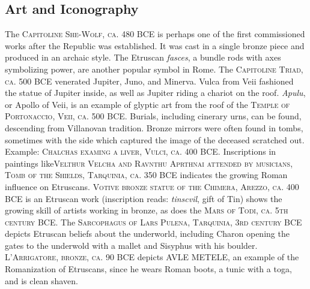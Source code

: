 \documentclass{article}
\begin{document}
\subsection{Art and Iconography}
The \textsc{Capitoline She-Wolf, ca. 480 BCE} is perhaps one of the first commissioned works after the Republic was established.  It was cast in a single bronze piece and produced in an archaic style.  The Etruscan \textit{fasces}, a bundle rods with axes symbolizing power, are another popular symbol in Rome.  The \textsc{Capitoline Triad, ca. 500 BCE} venerated Jupiter, Juno, and Minerva.  Vulca from Veii fashioned the statue of Jupiter inside, as well as Jupiter riding a chariot on the roof.  \textit{Apulu}, or Apollo of Veii, is an example of glyptic art from the roof of the \textsc{Temple of Portonaccio, Veii, ca. 500 BCE}.  Burials, including cinerary urns, can be found, descending from Villanovan tradition.  Bronze mirrors were often found in tombs, sometimes with the side which captured the image of the deceased scratched out.  Example: \textsc{Chalchas examing a liver, Vulci, ca. 400 BCE}.  Inscriptions in paintings like\textsc{Velthur Velcha and Ravnthu Aprthnai attended by musicians, Tomb of the Shields, Tarquinia, ca. 350 BCE} indicates the growing Roman influence on Etruscans.  \textsc{Votive bronze statue of the Chimera, Arezzo, ca. 400 BCE} is an Etruscan work (inscription reads: \textit{tinscvil}, gift of Tin) shows the growing skill of artists working in bronze, as does the \textsc{Mars of Todi, ca. 5th century BCE}.  The \textsc{Sarcophagus of Lars Pulena, Tarquinia, 3rd century BCE} depicts Etruscan beliefs about the underworld, including Charon opening the gates to the underwold with a mallet and Sisyphus with his boulder.  \textsc{L'Arrigatore, bronze, ca. 90 BCE} depicts AVLE METELE, an example of the Romanization of Etruscans, since he wears Roman boots, a tunic with a toga, and is clean shaven.
\end{document}
